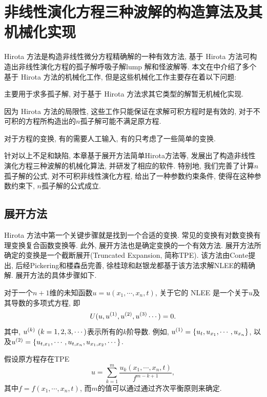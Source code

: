 \chapter{非线性演化方程三种波解的构造算法及其机械化实现}\label{ch02}
Hirota 方法是构造非线性微分方程精确解的一种有效方法, 基于 Hirota 方法可构造出非线性演化方程的孤子解\D 呼吸子解\D lump 解和怪波解等. 本文在中介绍了多个基于 Hirota 方法的机械化工作, 但是这些机械化工作主要存在着以下问题:
\begin{inparaenum}[(1)]
\item 主要用于求多孤子解, 对于基于 Hirota 方法求其它类型的解暂无机械化实现.
\item 因为 Hirota 方法的局限性, 这些工作只能保证在求解可积方程时是有效的, 对于不可积的方程所构造出的$n$孤子解可能不满足原方程. 
\item 对于方程的变换, 有的需要人工输入, 有的只考虑了一些简单的变换. 
\end{inparaenum}

针对以上不足和缺陷, 本章基于\Painleve{}展开方法\D 简单Hirota方法等, 发展出了构造非线性演化方程三种波解的机械化算法, 并研发了相应的软件. 特别地, 我们完善了计算$n$孤子解的公式, 对不可积非线性演化方程, 给出了一种参数约束条件, 使得在这种参数约束下, $n$孤子解的公式成立. 

\section{\Painleve{}展开方法}

Hirota 方法中第一个关键步骤就是找到一个合适的变换. 常见的变换有对数变换\D 有理变换\D 复合函数变换等.  此外, \Painleve{}展开方法也是确定变换的一个有效方法. \Painleve{}展开方法所确定的变换是一个\Painleve{}截断展开(Truncated \Painleve{} Expansion, 简称TPE). 该方法由Conte\cite{conte1989invariant}提出, 后经Pickering\cite{pickering1993new}和楼森岳\cite{lou1998extended}完善, 徐桂琼\cite{xuPHD}和赵银龙\cite{zhaoMST}都基于该方法求解NLEE的精确解. \Painleve{}展开方法的具体步骤如下. 

对于一个$n+1$维的未知函数$u=u(x_1,\cdots,x_n,t)$, 关于它的 NLEE 是一个关于$u$及其导数的多项式方程, 即
\begin{equation}
    U(u,u^{(1)},u^{(2)},u^{(3)}\cdots)=0. \label{oeq}
\end{equation}
其中, $u^{(k)}~(k=1,2,3,\cdots)$表示所有的$k$阶导数. 例如, $u^{(1)}=\left\{u_t,u_{x_1},\cdots,u_{x_n}\right\}$, 以及$u^{(2)}=\left\{u_{t,x_1},\cdots,u_{t,x_n},u_{x_1,x_2},\cdots\right\}$.

假设原方程存在TPE
\begin{equation}
    u=\sum_{k=1}^{m}{\frac{u_k(x_1,\cdots,x_n,t)}{f^{m-k+1}}},  \label{tr}
\end{equation}
其中$f=f(x_1,\cdots,x_n,t)$, 而$m$的值可以通过通过齐次平衡原则来确定. 

